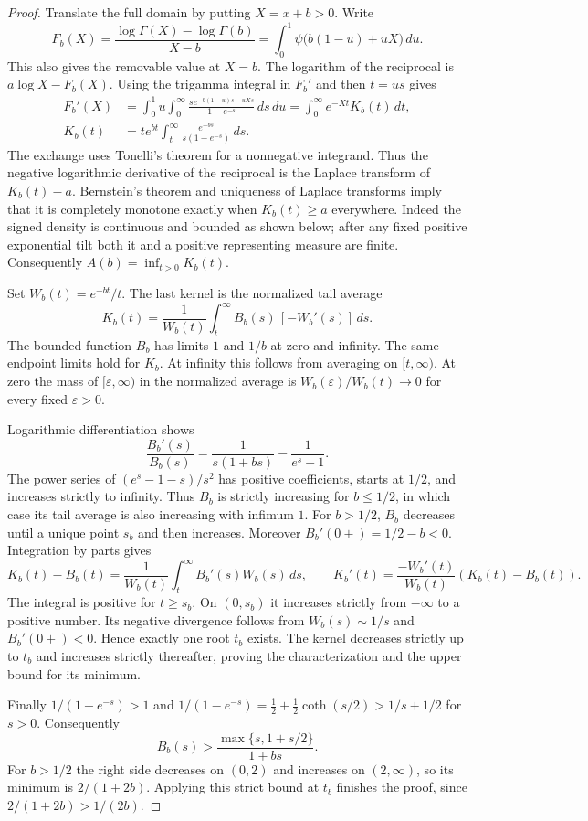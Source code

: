 \documentclass[11pt,a4paper]{article}
\numberwithin{equation}{section}
\begin{document}
\begin{proof}
Translate the full domain by putting $X=x+b>0$. Write
\[
 F_b(X)=\frac{\log\Gamma(X)-\log\Gamma(b)}{X-b}
        =\int_0^1\psi\bigl(b(1-u)+uX\bigr)\,du .
\]
This also gives the removable value at $X=b$.
The logarithm of the reciprocal is $a\log X-F_b(X)$.
Using the trigamma integral in $F_b'$ and then $t=us$ gives
\begin{align*}
 F_b'(X)
 &=\int_0^1 u\int_0^\infty
       \frac{s e^{-b(1-u)s-uXs}}{1-e^{-s}}\,ds\,du
   =\int_0^\infty e^{-Xt}K_b(t)\,dt,\\
 K_b(t)&=t e^{bt}\int_t^\infty\frac{e^{-bs}}{s(1-e^{-s})}\,ds .
\end{align*}
The exchange uses Tonelli's theorem for a nonnegative integrand.
Thus the negative logarithmic derivative of the reciprocal is the Laplace
transform of $K_b(t)-a$. Bernstein's theorem and uniqueness of Laplace
transforms imply that it is completely monotone exactly when
$K_b(t)\ge a$ everywhere. Indeed the signed density is continuous and
bounded as shown below; after any fixed positive exponential tilt both
it and a positive representing measure are finite. Consequently
$A(b)=\inf_{t>0}K_b(t)$.

Set $W_b(t)=e^{-bt}/t$. The last kernel is the normalized tail average
\[
 K_b(t)=\frac{1}{W_b(t)}
              \int_t^\infty B_b(s)\,[-W_b'(s)]\,ds.
\]
The bounded function $B_b$ has limits $1$ and $1/b$ at zero and
infinity. The same endpoint limits hold for $K_b$. At infinity this
follows from averaging on $[t,\infty)$. At zero the mass of
$[\varepsilon,\infty)$ in the normalized average is
$W_b(\varepsilon)/W_b(t)\to0$ for every fixed $\varepsilon>0$.

Logarithmic differentiation shows
\[
 \frac{B_b'(s)}{B_b(s)}
      =\frac1{s(1+bs)}-\frac1{e^s-1}.
\]
The power series of $(e^s-1-s)/s^2$ has positive coefficients,
starts at $1/2$, and increases strictly to infinity. Thus $B_b$ is
strictly increasing for $b\le1/2$, in which case its tail average
is also increasing with infimum $1$. For $b>1/2$, $B_b$ decreases
until a unique point $s_b$ and then increases. Moreover
$B_b'(0+)=1/2-b<0$. Integration by parts gives
\[
 K_b(t)-B_b(t)=\frac{1}{W_b(t)}
                \int_t^\infty B_b'(s)W_b(s)\,ds,
 \qquad
 K_b'(t)=\frac{-W_b'(t)}{W_b(t)}(K_b(t)-B_b(t)).
\]
The integral is positive for $t\ge s_b$. On $(0,s_b)$ it increases
strictly from $-\infty$ to a positive number. Its negative divergence
follows from $W_b(s)\sim1/s$ and $B_b'(0+)<0$. Hence exactly one
root $t_b$ exists. The kernel decreases strictly up to $t_b$ and
increases strictly thereafter, proving the characterization and the
upper bound for its minimum.

Finally $1/(1-e^{-s})>1$ and
$1/(1-e^{-s})=\tfrac12+\tfrac12\coth(s/2)>1/s+1/2$ for $s>0$.
Consequently
\[
 B_b(s)>\frac{\max\{s,1+s/2\}}{1+bs}.
\]
For $b>1/2$ the right side decreases on $(0,2)$ and increases on
$(2,\infty)$, so its minimum is $2/(1+2b)$. Applying this strict
bound at $t_b$ finishes the proof, since $2/(1+2b)>1/(2b)$.
\end{proof}
\end{document}
